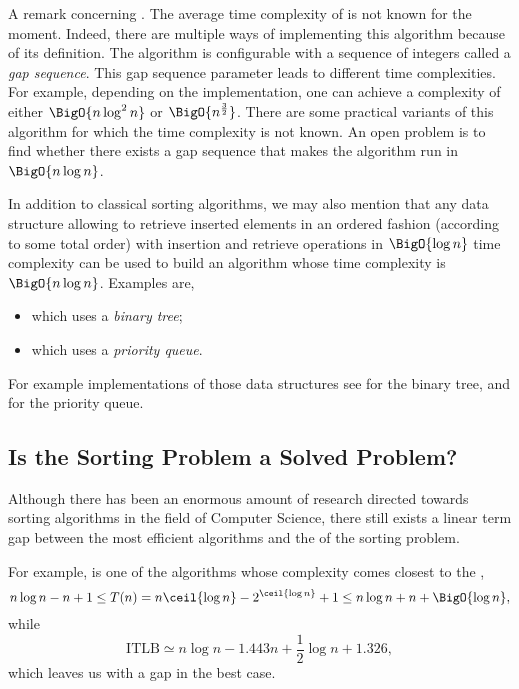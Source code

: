 A remark concerning \shellsort. The average time complexity of \shellsort is not
known for the moment. Indeed, there are multiple ways of implementing this
algorithm because of its definition. The \shellsort algorithm is configurable
with a sequence of integers called a \emph{gap sequence}. This gap sequence
parameter leads to different time complexities. For example, depending on the
implementation, one can achieve a complexity of either $\BigO{n \log^2 n}$ or
$\BigO{n^{\frac{3}{2}}}$. There are some practical variants of this algorithm
for which the time complexity is not known. An open problem is to find whether
there exists a gap sequence that makes the algorithm run in $\BigO{n \log
n}$.

In addition to classical sorting algorithms, we may also mention that any data
structure allowing to retrieve inserted elements in an ordered fashion
(according to some total order) with insertion and retrieve operations in
$\BigO{\log n}$ time complexity can be used to build an algorithm whose time
complexity is $\BigO{n \log n}$. Examples are,

\begin{itemize}
\item \binarytreesort which uses a \emph{binary tree};
\item \tournamentsort which uses a \emph{priority queue}.
\end{itemize}

For example implementations of those data structures see
\citet*{sleator:1985} for the binary tree, and
\citet*{leiserson:2001} for the priority queue.


\subsection*{Is the Sorting Problem a Solved Problem?}

Although there has been an enormous amount of research directed towards sorting
algorithms in the field of Computer Science, there still exists a linear term
gap between the most efficient algorithms and the  of the
sorting problem.

For example, \mergesort is one of the algorithms whose complexity comes closest
to the , \ie
\begin{displaymath}
n \log n - n + 1 \le T(n) = n \ceil{\log n} - 2^{\ceil{\log n}} + 1 \le n \log
n + n + \BigO{\log n},
\end{displaymath}
while
\begin{displaymath}
\text{ITLB} \simeq n \log n - 1.443 n + \frac{1}{2} \log n + 1.326,
\end{displaymath}
which leaves us with a  gap in the best case.
